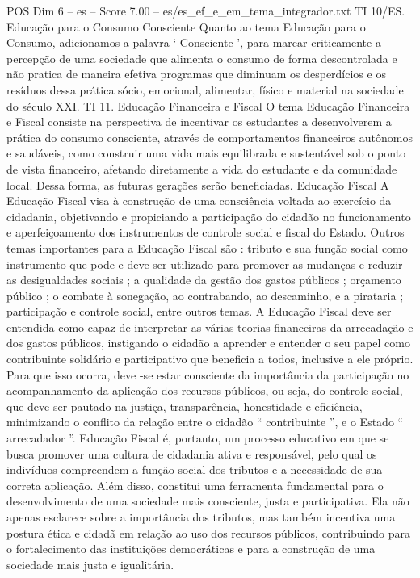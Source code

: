 \begin{textsample}{POS Dim 6 – es – Score 7.00 – es/es\_ef\_e\_em\_tema\_integrador.txt}
TI 10/ES.
Educação para o Consumo Consciente Quanto ao tema Educação para o Consumo, adicionamos a palavra ‘ Consciente ’, para marcar criticamente a percepção de uma sociedade que alimenta o consumo de forma descontrolada e não pratica de maneira efetiva programas que diminuam os desperdícios e os resíduos dessa prática sócio, emocional, alimentar, físico e material na sociedade do século XXI.
TI 11.
Educação Financeira e Fiscal O tema Educação Financeira e Fiscal consiste na perspectiva de incentivar os estudantes a desenvolverem a prática do consumo consciente, através de comportamentos financeiros autônomos e saudáveis, como construir uma vida mais equilibrada e sustentável sob o ponto de vista financeiro, afetando diretamente a vida do estudante e da comunidade local.
Dessa forma, as futuras gerações serão beneficiadas.
Educação Fiscal A Educação Fiscal visa à construção de uma consciência voltada ao exercício da cidadania, objetivando e propiciando a participação do cidadão no funcionamento e aperfeiçoamento dos instrumentos de controle social e fiscal do Estado.
Outros temas importantes para a Educação Fiscal são : tributo e sua função social como instrumento que pode e deve ser utilizado para promover as mudanças e reduzir as desigualdades sociais ; a qualidade da gestão dos gastos públicos ; orçamento público ; o combate à sonegação, ao contrabando, ao descaminho, e a pirataria ; participação e controle social, entre outros temas.
A Educação Fiscal deve ser entendida como capaz de interpretar as várias teorias financeiras da arrecadação e dos gastos públicos, instigando o cidadão a aprender e entender o seu papel como contribuinte solidário e participativo que beneficia a todos, inclusive a ele próprio.
Para que isso ocorra, deve -se estar consciente da importância da participação no acompanhamento da aplicação dos recursos públicos, ou seja, do controle social, que deve ser pautado na justiça, transparência, honestidade e eficiência, minimizando o conflito da relação entre o cidadão “ contribuinte ”, e o Estado “ arrecadador ”.
Educação Fiscal é, portanto, um processo educativo em que se busca promover uma cultura de cidadania ativa e responsável, pelo qual os indivíduos compreendem a função social dos tributos e a necessidade de sua correta aplicação.
Além disso, constitui uma ferramenta fundamental para o desenvolvimento de uma sociedade mais consciente, justa e participativa.
Ela não apenas esclarece sobre a importância dos tributos, mas também incentiva uma postura ética e cidadã em relação ao uso dos recursos públicos, contribuindo para o fortalecimento das instituições democráticas e para a construção de uma sociedade mais justa e igualitária.

\end{textsample}
